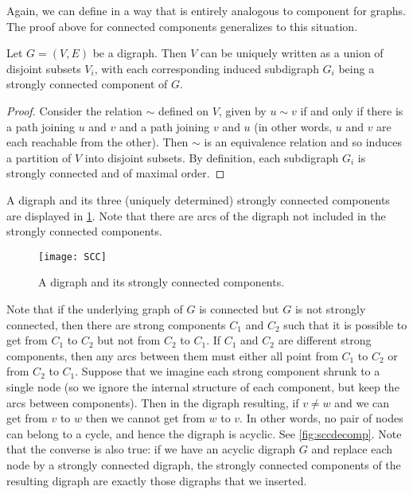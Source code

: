 Again, we can define  in a
way that is entirely analogous to component for graphs. The proof
above for connected components generalizes to this situation.

\begin{Theorem}
\label{thm:scc}
Let $G=(V, E)$ be a digraph. Then $V$ can be uniquely written as a union of
disjoint subsets $V_i$, with each corresponding induced subdigraph $G_i$ being
a strongly connected component of $G$.
\end{Theorem}

\begin{proof} Consider the relation $\sim$ defined on $V$, given by
$u\sim v$ if and only if there is a path joining $u$ and $v$ and a path
joining $v$ and $u$ (in other words, $u$ and $v$ are each reachable
from the other). Then $\sim$ is an equivalence relation and so induces
a partition of $V$ into disjoint subsets.  By definition, each 
subdigraph $G_i$ is strongly connected and of maximal order.
\end{proof}

\begin{Example}\label{eg:scc}
A digraph and its three (uniquely determined) strongly connected
components are displayed in \cref{fig:scc}. Note that there are
arcs of the digraph not included in the strongly connected components.
\end{Example}

\begin{figure}[htbp]
\centering
\texttt{[image: SCC]}
\caption{A digraph and its strongly connected components.}
\label{fig:scc}
\end{figure}

Note that if the underlying graph of $G$ is connected but $G$ is
not strongly connected, then  there are strong components $C_1$ and
$C_2$ such that it is possible to get from $C_1$ to $C_2$ but not
from $C_2$ to $C_1$. If $C_1$ and $C_2$ are different strong
components, then any arcs between them must either all point from
$C_1$ to $C_2$ or from $C_2$ to $C_1$.  Suppose that we imagine
each strong component shrunk to a single node (so we ignore the
internal structure of each component, but keep the arcs between
components). Then in the digraph resulting, if $v\neq w$ and we can
get from $v$ to $w$ then we cannot get from $w$ to $v$. In other
words, no pair of nodes can belong to a cycle, and hence the digraph
is acyclic. See \cref{fig:sccdecomp}. Note that the converse
is also true: if we have an acyclic digraph $G$ and replace each
node by a strongly connected digraph, the strongly connected
components of the resulting digraph are exactly those digraphs that
we inserted.

